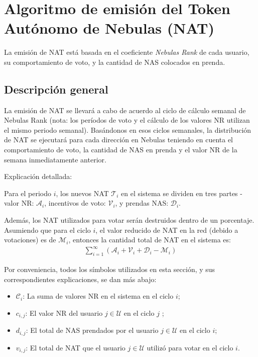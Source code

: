 \section{Algoritmo de emisión del Token Autónomo de Nebulas (NAT)}

La emisión de NAT está basada en el coeficiente \textit{Nebulas Rank} de cada usuario, su comportamiento de voto, y la cantidad de NAS colocados en prenda.

\subsection{Descripción general}
La emisión de NAT se llevará a cabo de acuerdo al ciclo de cálculo semanal de Nebulas Rank (nota: los períodos de voto y el cálculo de los valores NR utilizan el mismo periodo semanal). Basándonos en esos ciclos semanales, la distribución de NAT se ejecutará para cada dirección en Nebulas teniendo en cuenta el comportamiento de voto, la cantidad de NAS en prenda y el valor NR de la semana inmediatamente anterior.

Explicación detallada:

Para el periodo $i$, los nuevos NAT $\mathcal{T}_i$ en el sistema se dividen en tres partes - valor NR: $\mathcal{A}_i$, incentivos de voto: $\mathcal{V}_i$, y prendas NAS: $\mathcal{D}_i$.

Además, los NAT utilizados para votar serán destruidos dentro de un porcentaje. Asumiendo que para el ciclo $i$, el valor reducido de NAT en la red (debido a votaciones) es de $\mathcal{M}_i$, entonces la cantidad total de NAT en el sistema es:
\begin{align}
\sum_{i=1}^{\infty} (\mathcal{A}_i + \mathcal{V}_i + \mathcal{D}_i - \mathcal{M}_i)
\end{align}

Por conveniencia, todos los símbolos utilizados en esta sección, y sus correspondientes explicaciones, se dan más abajo:

\begin{itemize}
\item $\mathcal{C}_i$: La suma de valores NR en el sistema en el ciclo $i$;
\item $c_{i,j}$: El valor NR del usuario $j \in \mathcal{U}$ en el ciclo $j$ ;
\item $d_{i,j}$: El total de NAS prendados por el usuario $j \in \mathcal{U}$ en el ciclo $i$;
\item $v_{i,j}$: El total de NAT que el usuario $j \in \mathcal{U}$ utilizó para votar en el ciclo $i$.
\end{itemize}


